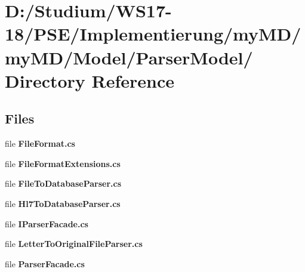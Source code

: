 \hypertarget{dir_D_3A_2FStudium_2FWS17_2D18_2FPSE_2FImplementierung_2FmyMD_2FmyMD_2FModel_2FParserModel_2F}{
\section{D:/Studium/WS17-18/PSE/Implementierung/my\-MD/my\-MD/Model/Parser\-Model/ Directory Reference}
\label{dir_D_3A_2FStudium_2FWS17_2D18_2FPSE_2FImplementierung_2FmyMD_2FmyMD_2FModel_2FParserModel_2F}
}


\subsection*{Files}
\begin{CompactItemize}
\item 
file {\bf File\-Format.cs}
\item 
file {\bf File\-Format\-Extensions.cs}
\item 
file {\bf File\-To\-Database\-Parser.cs}
\item 
file {\bf Hl7To\-Database\-Parser.cs}
\item 
file {\bf IParser\-Facade.cs}
\item 
file {\bf Letter\-To\-Original\-File\-Parser.cs}
\item 
file {\bf Parser\-Facade.cs}
\end{CompactItemize}
